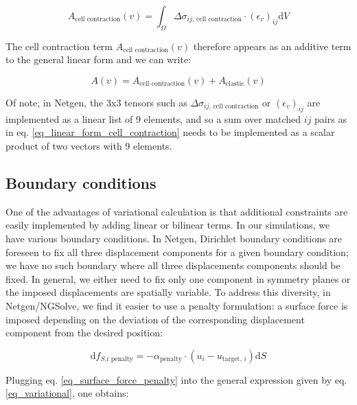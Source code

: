\documentclass[11pt]{amsart}
\begin{document}
\begin{equation}
A_\text{cell contraction}\left(v\right)=\int_\Omega \Delta \sigma_{ij\text{, cell contraction}} \cdot \left(\epsilon_v\right)_{ij} \text{d}V\label{eq_linear_form_cell_contraction}
 \end{equation}
 
The cell contraction term $A_\text{cell contraction}\left(v\right)$ therefore appears as an additive term to the general linear form and we can write:

\begin{equation}
A\left(v\right)=A_\text{cell contraction}\left(v\right)+A_\text{elastic}\left(v\right) \label{eq_self_contraction_A_addition}
\end{equation}

Of note, in Netgen, the 3x3 tensors such as $\Delta \sigma_{ij\text{, cell contraction}}$ or $\left(\epsilon_v\right)_{ij}$ are implemented as a linear list of 9 elements, and so a sum over matched $ij$ pairs as in eq. \ref{eq_linear_form_cell_contraction} needs to be implemented as a scalar product of two vectors with 9 elements.


\subsection{Boundary conditions}

One of the advantages of variational calculation is that additional constraints are easily implemented by adding linear or bilinear terms. In our simulations, we have various boundary conditions. In Netgen, Dirichlet boundary conditions are foreseen to fix all three displacement components for a given boundary condition; we have no such boundary where all three displacements components should be fixed. In general, we either need to fix only one component in symmetry planes or the imposed displacements are spatially variable. To address this diversity, in Netgen/NGSolve, we find it easier to use a penalty formulation\cite{babuska_finite_1973}: a surface force is imposed depending on the deviation of the corresponding displacement component from the desired position:

\begin{equation}
\text{d}f_{S\text{,}i\text{ penalty}}=-\alpha_\text{penalty}\cdot \left(u_i - u_{\text{target, }i}\right)\text{d}S \label{eq_surface_force_penalty}
\end{equation}

Plugging eq. \ref{eq_surface_force_penalty} into the general expression given by eq. \ref{eq_variational}, one obtains: 
\end{document}
